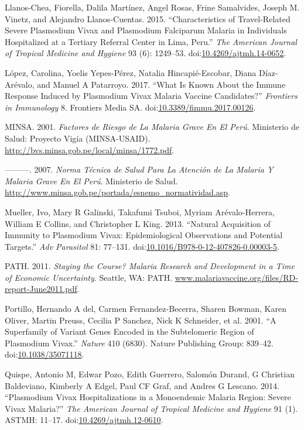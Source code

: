 \documentclass[a4paper]{article}
\begin{document}
\hypertarget{ref-llanoschea2015}{}
Llanos-Chea, Fiorella, Dalila Martínez, Angel Rosas, Frine Samalvides,
Joseph M. Vinetz, and Alejandro Llanos-Cuentas. 2015. ``Characteristics
of Travel-Related Severe Plasmodium Vivax and Plasmodium Falciparum
Malaria in Individuals Hospitalized at a Tertiary Referral Center in
Lima, Peru.'' \emph{The American Journal of Tropical Medicine and
Hygiene} 93 (6): 1249--53.
doi:\href{https://doi.org/10.4269/ajtmh.14-0652}{10.4269/ajtmh.14-0652}.

\hypertarget{ref-lopez2017}{}
López, Carolina, Yoelis Yepes-Pérez, Natalia Hincapié-Escobar, Diana
Díaz-Arévalo, and Manuel A Patarroyo. 2017. ``What Is Known About the
Immune Response Induced by Plasmodium Vivax Malaria Vaccine
Candidates?'' \emph{Frontiers in Immunology} 8. Frontiers Media SA.
doi:\href{https://doi.org/10.3389/fimmu.2017.00126}{10.3389/fimmu.2017.00126}.

\hypertarget{ref-factores2001}{}
MINSA. 2001. \emph{Factores de Riesgo de La Malaria Grave En El Perú}.
Ministerio de Salud: Proyecto Vigía (MINSA-USAID).
\url{http://bvs.minsa.gob.pe/local/minsa/1772.pdf}.

\hypertarget{ref-norma2001}{}
---------. 2007. \emph{Norma Técnica de Salud Para La Atención de La
Malaria Y Malaria Grave En El Perú}. Ministerio de Salud.
\url{http://www.minsa.gob.pe/portada/esnemo_normatividad.asp}.

\hypertarget{ref-mueller2013}{}
Mueller, Ivo, Mary R Galinski, Takafumi Tsuboi, Myriam Arévalo-Herrera,
William E Collins, and Christopher L King. 2013. ``Natural Acquisition
of Immunity to Plasmodium Vivax: Epidemiological Observations and
Potential Targets.'' \emph{Adv Parasitol} 81: 77--131.
doi:\href{https://doi.org/10.1016/B978-0-12-407826-0.00003-5}{10.1016/B978-0-12-407826-0.00003-5}.

\hypertarget{ref-path2011}{}
PATH. 2011. \emph{Staying the Course? Malaria Research and Development
in a Time of Economic Uncertainty}. Seattle, WA: PATH.
\url{www.malariavaccine.org/files/RD-report-June2011.pdf}.

\hypertarget{ref-portillo2001vir}{}
Portillo, Hernando A del, Carmen Fernandez-Becerra, Sharen Bowman, Karen
Oliver, Martin Preuss, Cecilia P Sanchez, Nick K Schneider, et al. 2001.
``A Superfamily of Variant Genes Encoded in the Subtelomeric Region of
Plasmodium Vivax.'' \emph{Nature} 410 (6830). Nature Publishing Group:
839--42. doi:\href{https://doi.org/10.1038/35071118}{10.1038/35071118}.

\hypertarget{ref-quispe2014}{}
Quispe, Antonio M, Edwar Pozo, Edith Guerrero, Salomón Durand, G
Christian Baldeviano, Kimberly A Edgel, Paul CF Graf, and Andres G
Lescano. 2014. ``Plasmodium Vivax Hospitalizations in a Monoendemic
Malaria Region: Severe Vivax Malaria?'' \emph{The American Journal of
Tropical Medicine and Hygiene} 91 (1). ASTMH: 11--17.
doi:\href{https://doi.org/10.4269/ajtmh.12-0610}{10.4269/ajtmh.12-0610}.
\end{document}
